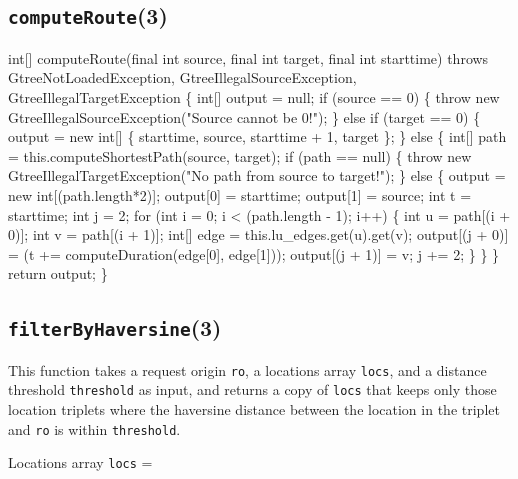 \subsection{\texttt{computeRoute}(3)}
\nwenddocs{}\endmoddef{}
int[] computeRoute(final int source, final int target, final int starttime)
throws GtreeNotLoadedException, GtreeIllegalSourceException, GtreeIllegalTargetException \{
  int[] output = null;
  if (source == 0) \{
    throw new GtreeIllegalSourceException("Source cannot be 0!");
  \} else if (target == 0) \{
    output = new int[] \{ starttime, source, starttime + 1, target \};
  \} else \{
    int[] path = this.computeShortestPath(source, target);
    if (path == null) \{
      throw new GtreeIllegalTargetException("No path from source to target!");
    \} else \{
      output = new int[(path.length*2)];
      output[0] = starttime;
      output[1] = source;
      int t = starttime;
      int j = 2;
      for (int i = 0; i < (path.length - 1); i++) \{
        int u = path[(i + 0)];
        int v = path[(i + 1)];
        int[] edge = this.lu_edges.get(u).get(v);
        output[(j + 0)] = (t += computeDuration(edge[0], edge[1]));
        output[(j + 1)] = v;
        j += 2;
      \}
    \}
  \}
  return output;
\}
\eatline
{}\nwendcode{}\nwdocspar
\subsection{\texttt{filterByHaversine}(3)}
This function takes a request origin {\tt{}ro}, a locations array {\tt{}locs}, and
a distance threshold {\tt{}threshold} as input, and returns a copy of {\tt{}locs}
that keeps only those location triplets where the haversine distance between
the location in the triplet and {\tt{}ro} is within {\tt{}threshold}.

Locations array {\tt{}locs} =

\noindent
{}

